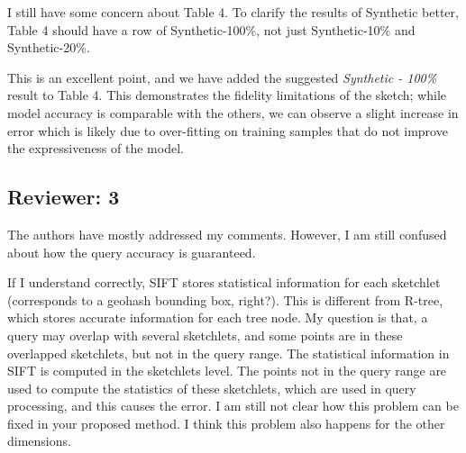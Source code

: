\documentclass{article}
\begin{document}
I still have some concern about Table 4. To clarify the results of Synthetic better, Table 4 should have a row of Synthetic-100\%, not just Synthetic-10\% and Synthetic-20\%.

\begin{tcolorbox}
    This is an excellent point, and we have added the suggested \emph{Synthetic - 100\%} result to Table 4. This demonstrates the fidelity limitations of the sketch; while model accuracy is comparable with the others, we can observe a slight increase in error which is likely due to over-fitting on training samples that do not improve the expressiveness of the model.
\end{tcolorbox}

\vspace{1em}

\subsection*{Reviewer: 3}\label{reviewer-3}

The authors have mostly addressed my comments. However, I am still confused about how the query accuracy is guaranteed.

If I understand correctly, SIFT stores statistical information for each sketchlet (corresponds to a geohash bounding box, right?). This is different from R-tree, which stores accurate information for each tree node. My question is that, a query may overlap with several sketchlets, and some points are in these overlapped sketchlets, but not in the query range. The statistical information in SIFT is computed in the sketchlets level. The points not in the query range are used to compute the statistics of these sketchlets, which are used in query processing, and this causes the error. I am still not clear how this problem can be fixed in your proposed method. I think this problem also happens for the other dimensions.
\end{document}
